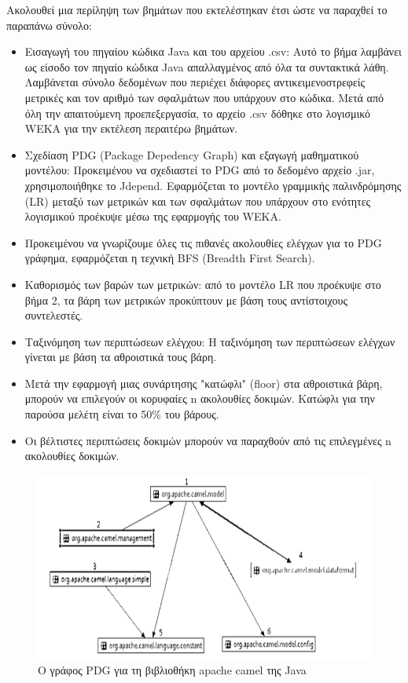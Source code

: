 \documentclass[12pt]{article}
\begin{document}
\par Ακολουθεί μια περίληψη των βημάτων που εκτελέστηκαν έτσι ώστε να παραχθεί το παραπάνω σύνολο:

\begin{itemize}
\item Εισαγωγή του πηγαίου κώδικα Java και του αρχείου .csv: Αυτό το βήμα λαμβάνει ως είσοδο τον πηγαίο κώδικα Java απαλλαγμένος από όλα τα συντακτικά λάθη. Λαμβάνεται σύνολο δεδομένων που περιέχει διάφορες αντικειμενοστρεφείς μετρικές και τον αριθμό των σφαλμάτων που υπάρχουν στο κώδικα. Μετά από όλη την απαιτούμενη προεπεξεργασία, το αρχείο .csv δόθηκε στο λογισμικό WEKA για την εκτέλεση περαιτέρω βημάτων.

\item Σχεδίαση PDG (Package Depedency Graph) και εξαγωγή μαθηματικού μοντέλου: Προκειμένου να σχεδιαστεί το PDG από το δεδομένο αρχείο .jar, χρησιμοποιήθηκε το Jdepend. Εφαρμόζεται το μοντέλο γραμμικής παλινδρόμησης (LR) μεταξύ των μετρικών και των σφαλμάτων που υπάρχουν στο ενότητες λογισμικού προέκυψε μέσω της εφαρμογής του WEKA.

\item Προκειμένου να γνωρίζουμε όλες τις πιθανές ακολουθίες ελέγχων για το PDG γράφημα, εφαρμόζεται η τεχνική BFS (Breadth First Search).

\item Καθορισμός των βαρών των μετρικών: από το μοντέλο LR που προέκυψε στο βήμα 2, τα βάρη των μετρικών προκύπτουν με βάση τους αντίστοιχους συντελεστές.

\item Ταξινόμηση των περιπτώσεων ελέγχου: Η ταξινόμηση των περιπτώσεων ελέγχων γίνεται με βάση τα αθροιστικά τους βάρη. 

\item Μετά την εφαρμογή μιας συνάρτησης "κατώφλι" (floor) στα αθροιστικά βάρη, μπορούν να επιλεγούν οι κορυφαίες n ακολουθίες δοκιμών. Κατώφλι για την παρούσα μελέτη είναι το 50\% του βάρους.

\item Οι βέλτιστες περιπτώσεις δοκιμών μπορούν να παραχθούν από τις επιλεγμένες n ακολουθίες δοκιμών.

\end{itemize}
 
\begin{figure}
\label{fig:pdg_graph}
\caption{Ο γράφος PDG για τη βιβλιοθήκη apache camel της Java}
\includegraphics[width=\textwidth,height=\textheight,keepaspectratio]{pdg_graph.PNG}
\end{figure}
\end{document}
